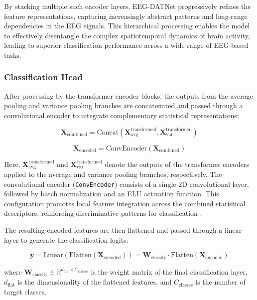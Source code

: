 \documentclass[pdflatex,sn-mathphys-num]{sn-jnl}%
\theoremstyle{thmstyleone}%
\theoremstyle{thmstyletwo}%
\theoremstyle{thmstylethree}%
\begin{document}
By stacking multiple such encoder layers, EEG-DATNet progressively refines the feature representations, capturing increasingly abstract patterns and long-range dependencies in the EEG signals. This hierarchical processing enables the model to effectively disentangle the complex spatiotemporal dynamics of brain activity, leading to superior classification performance across a wide range of EEG-based tasks.

\subsubsection{Classification Head}

After processing by the transformer encoder blocks, the outputs from the average pooling and variance pooling branches are concatenated and passed through a convolutional encoder to integrate complementary statistical representations:

\begin{equation}
\mathbf{X}_{\text{combined}} = \text{Concat}(\mathbf{X}_{\text{avg}}^{\text{transformed}}, \mathbf{X}_{\text{var}}^{\text{transformed}})
\end{equation}

\begin{equation}
\mathbf{X}_{\text{encoded}} = \text{ConvEncoder}(\mathbf{X}_{\text{combined}})
\end{equation}

Here, $\mathbf{X}_{\text{avg}}^{\text{transformed}}$ and $\mathbf{X}_{\text{var}}^{\text{transformed}}$ denote the outputs of the transformer encoders applied to the average and variance pooling branches, respectively. The convolutional encoder (\texttt{ConvEncoder}) consists of a single 2D convolutional layer, followed by batch normalization and an ELU activation function. This configuration promotes local feature integration across the combined statistical descriptors, reinforcing discriminative patterns for classification \cite{vaswani2017attention}.

The resulting encoded features are then flattened and passed through a linear layer to generate the classification logits:

\begin{equation}
\mathbf{y} = \text{Linear}(\text{Flatten}(\mathbf{X}_{\text{encoded}})) = \mathbf{W}_{\text{classify}} \cdot \text{Flatten}(\mathbf{X}_{\text{encoded}})
\end{equation}

where $\mathbf{W}_{\text{classify}} \in \mathbb{R}^{d_{\text{flat}} \times C_{\text{classes}}}$ is the weight matrix of the final classification layer, $d_{\text{flat}}$ is the dimensionality of the flattened features, and $C_{\text{classes}}$ is the number of target classes.
\end{document}
